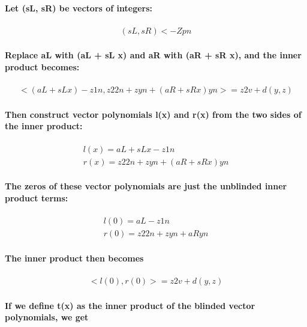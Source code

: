 \documentclass{article}
\begin{document}
\paragraph{Let (sL, sR) be vectors of integers:}

\begin{eqnarray}
  (sL, sR) <- Zpn
\end{eqnarray}

\paragraph{Replace aL with (aL + sL x) and aR with (aR + sR x), and the inner product becomes:}

\begin{eqnarray}
  <(aL + sL x) - z 1n, z2 2n + z yn + (aR+ sR x)yn> = z2 v + d(y,z)
\end{eqnarray}

\paragraph{Then construct vector polynomials l(x) and r(x) from the two sides of the inner product:}

\begin{eqnarray}
  l(x) = aL + sL x - z 1n\\
  r(x) = z2 2n + z yn + (aR+ sR x)yn
\end{eqnarray}

\paragraph{The zeros of these vector polynomials are just the unblinded inner product terms:}

\begin{eqnarray}
  l(0) = aL - z 1n\\
  r(0) = z2 2n + z yn + aRyn
\end{eqnarray}

\paragraph{The inner product then becomes}

\begin{eqnarray}
  <l(0), r(0)> = z2 v + d(y,z)
\end{eqnarray}

\paragraph{If we define t(x) as the inner product of the blinded vector polynomials, we get}
\end{document}

